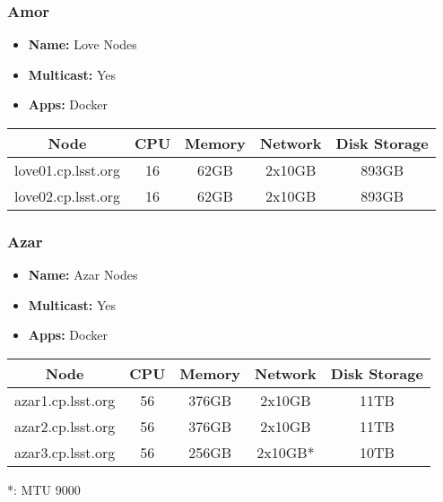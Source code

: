 \subsubsection{Amor}
\begin{itemize}
  \itemsep0em 
  \item \textbf{Name:}       Love Nodes
  \item \textbf{Multicast:}  Yes
  \item \textbf{Apps:}       Docker
\end{itemize}
\begin{center}
  \small
  \begin{tabular}{||c c c c c||}
    \hline
    \textbf{Node} & \textbf{CPU} & \textbf{Memory} & \textbf{Network} & \textbf{Disk Storage} \\ [0.5ex]
    \hline
    love01.cp.lsst.org & 16 & 62GB & 2x10GB & 893GB \\
    \hline
    love02.cp.lsst.org & 16 & 62GB & 2x10GB & 893GB \\
    \hline
  \end{tabular}
\end{center}

\subsubsection{Azar}
\begin{itemize}
  \itemsep0em 
  \item \textbf{Name:}       Azar Nodes
  \item \textbf{Multicast:}  Yes
  \item \textbf{Apps:}       Docker
\end{itemize}
\begin{center}
  \small
  \begin{tabular}{||c c c c c||}
    \hline
    \textbf{Node} & \textbf{CPU} & \textbf{Memory} & \textbf{Network} & \textbf{Disk Storage} \\ [0.5ex]
    \hline
    azar1.cp.lsst.org & 56 & 376GB & 2x10GB & 11TB \\
    \hline
    azar2.cp.lsst.org & 56 & 376GB & 2x10GB & 11TB \\
    \hline
    azar3.cp.lsst.org & 56 & 256GB & 2x10GB* & 10TB \\
    \hline
  \end{tabular}
\end{center}

*: MTU 9000

